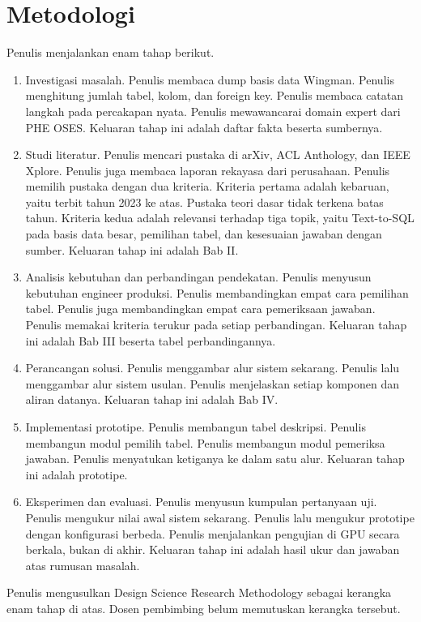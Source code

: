 \section{Metodologi}
Penulis menjalankan enam tahap berikut.
\begin{enumerate}
\item	Investigasi masalah. Penulis membaca dump basis data Wingman. Penulis menghitung jumlah tabel, kolom, dan foreign key. Penulis membaca catatan langkah pada percakapan nyata. Penulis mewawancarai domain expert dari PHE OSES. Keluaran tahap ini adalah daftar fakta beserta sumbernya.
\item	Studi literatur. Penulis mencari pustaka di arXiv, ACL Anthology, dan IEEE Xplore. Penulis juga membaca laporan rekayasa dari perusahaan. Penulis memilih pustaka dengan dua kriteria. Kriteria pertama adalah kebaruan, yaitu terbit tahun 2023 ke atas. Pustaka teori dasar tidak terkena batas tahun. Kriteria kedua adalah relevansi terhadap tiga topik, yaitu Text-to-SQL pada basis data besar, pemilihan tabel, dan kesesuaian jawaban dengan sumber. Keluaran tahap ini adalah Bab II.
\item	Analisis kebutuhan dan perbandingan pendekatan. Penulis menyusun kebutuhan engineer produksi. Penulis membandingkan empat cara pemilihan tabel. Penulis juga membandingkan empat cara pemeriksaan jawaban. Penulis memakai kriteria terukur pada setiap perbandingan. Keluaran tahap ini adalah Bab III beserta tabel perbandingannya.
\item	Perancangan solusi. Penulis menggambar alur sistem sekarang. Penulis lalu menggambar alur sistem usulan. Penulis menjelaskan setiap komponen dan aliran datanya. Keluaran tahap ini adalah Bab IV.
\item	Implementasi prototipe. Penulis membangun tabel deskripsi. Penulis membangun modul pemilih tabel. Penulis membangun modul pemeriksa jawaban. Penulis menyatukan ketiganya ke dalam satu alur. Keluaran tahap ini adalah prototipe.
\item	Eksperimen dan evaluasi. Penulis menyusun kumpulan pertanyaan uji. Penulis mengukur nilai awal sistem sekarang. Penulis lalu mengukur prototipe dengan konfigurasi berbeda. Penulis menjalankan pengujian di GPU secara berkala, bukan di akhir. Keluaran tahap ini adalah hasil ukur dan jawaban atas rumusan masalah.
\end{enumerate}

Penulis mengusulkan Design Science Research Methodology sebagai kerangka enam tahap di atas. Dosen pembimbing belum memutuskan kerangka tersebut.

